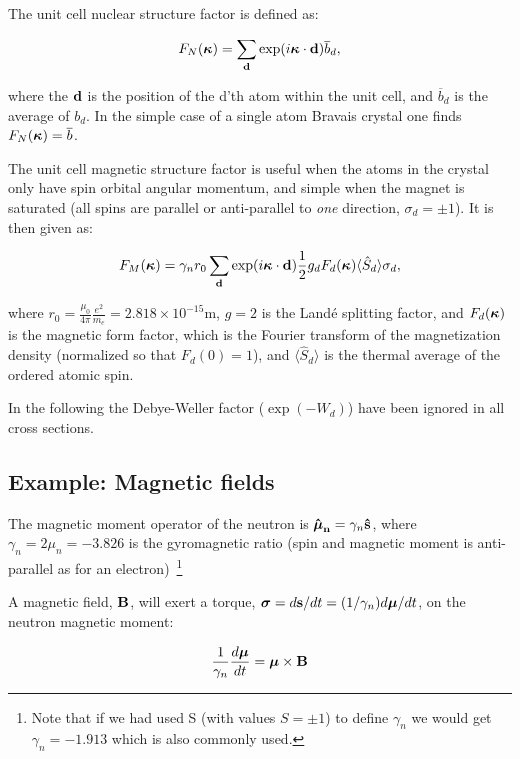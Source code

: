 The unit cell nuclear structure factor is defined as:

\begin{equation}
  F_N(\mathbf{\mbox{\boldmath $\kappa$}}) = \sum_{\mathbf{d}}
  \exp(i\mathbf{\mbox{\boldmath $\kappa$}} \cdot \mathbf{d})\overline{b}_d,
\end{equation}

where the $\mathbf{d}$ is the position of the d'th atom within the unit cell,
and $\overline{b}_d$ is the average of $b_d$. In the simple case of a
single atom Bravais crystal one finds $F_N(\mathbf{\mbox{\boldmath $\kappa$}}) = \overline{b}$.

The unit cell magnetic structure factor is useful when the atoms in
the crystal only have spin orbital angular momentum, and simple when
the magnet is saturated (all spins are parallel or anti-parallel to
\emph{one} direction, $\sigma_d=\pm1$). It is then given as: 

\begin{equation}
  F_M(\mathbf{\mbox{\boldmath $\kappa$}}) =
  \gamma_n r_0 \sum_{\mathbf{d}} \exp(i\mathbf{\mbox{\boldmath $\kappa$}} \cdot \mathbf{d})\frac{1}{2}g_d F_d(\mathbf{\mbox{\boldmath $\kappa$}})\langle
  \hat{S}_d\rangle \sigma_d,
\end{equation}

where $r_0=\frac{\mu_0}{4\pi}\frac{e^2}{m_e} = 2.818 \times 10^{-15}$m, $g=2$ is the
Land{\'e} splitting factor, and $F_d(\mathbf{\mbox{\boldmath $\kappa$}})$ is the magnetic form factor, which
is the Fourier transform of the magnetization density (normalized so that
$F_d(0) = 1$), and $\langle \hat{S}_d\rangle$ is the thermal average of the
ordered atomic spin.

In the following the Debye-Weller factor ($\exp(-W_d)$) have been ignored in
all cross sections.

\subsection{Example: Magnetic fields}

The magnetic moment operator of the neutron is $\mathbf{\hat{\mbox{\boldmath $\mu$}}_n} = \gamma_n \mathbf{\hat{s}}$, where
$\gamma_n = 2 \mu_n = -3.826$ is the gyromagnetic ratio (spin and magnetic
moment is anti-parallel as for an electron)~\footnote{Note that if we had used
S (with values $S=\pm 1$) to define $\gamma_n$ we would get $\gamma_n =
-1.913$ which is also commonly used.}

A magnetic field, $\mathbf{B}$, will exert a torque, $\mbox{\boldmath $\sigma$} = d\mathbf{s}/dt = (1/\gamma_n)d\mbox{\boldmath $\mu$}/dt$, on the neutron magnetic moment:
 
\begin{equation}
  \label{eq:torque}
  \frac{1}{\gamma_n} \frac{d\mbox{\boldmath $\mu$}}{dt} = \mbox{\boldmath $\mu$} \times \mathbf{B}
\end{equation}
 
